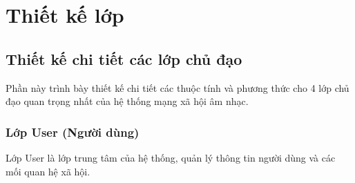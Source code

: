 \section{Thiết kế lớp}

\subsection{Thiết kế chi tiết các lớp chủ đạo}

Phần này trình bày thiết kế chi tiết các thuộc tính và phương thức cho 4 lớp chủ đạo quan trọng nhất của hệ thống mạng xã hội âm nhạc.

\subsubsection{Lớp User (Người dùng)}

Lớp User là lớp trung tâm của hệ thống, quản lý thông tin người dùng và các mối quan hệ xã hội.

